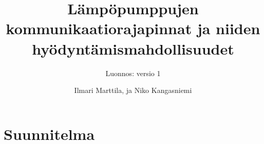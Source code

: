 \documentclass{tauthesis}
\begin{document}

\frontmatter


\title{Lämpöpumppujen kommunikaatiorajapinnat ja niiden hyödyntämismahdollisuudet}
\subtitle{Luonnos: versio 1}

\author{Ilmari Marttila, ja Niko Kangasniemi}






\keywords%
    {}

\maketitle





\tableofcontents


\listoffigures




\mainmatter
\chapter{Suunnitelma}


%
\end{document}
